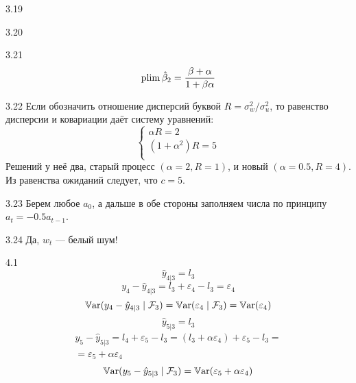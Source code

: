 \protect \hypertarget {soln:3.19}{}
\begin{solution}{{3.19}}
  
\end{solution}
\protect \hypertarget {soln:3.20}{}
\begin{solution}{{3.20}}
  
\end{solution}
\protect \hypertarget {soln:3.21}{}
\begin{solution}{{3.21}}
    \[
    \operatorname{plim} \hat \beta_2 = \frac{\beta + \alpha}{1 + \beta \alpha}
    \]
  
\end{solution}
\protect \hypertarget {soln:3.22}{}
\begin{solution}{{3.22}}
Если обозначить отношение дисперсий буквой $R = \sigma^2_w/\sigma^2_u$,
то равенство дисперсии и ковариации даёт систему уравнений:
\[
  \begin{cases}
    \alpha R = 2 \\
    (1+\alpha^2)R = 5 \\
  \end{cases}
\]
Решений у неё два, старый процесс $(\alpha=2, R=1)$, и новый $(\alpha=0.5, R=4)$.
Из равенства ожиданий следует, что $c=5$.
  
\end{solution}
\protect \hypertarget {soln:3.23}{}
\begin{solution}{{3.23}}
    Берем любое $a_0$, а дальше в обе стороны заполняем числа по принципу $a_t = -0.5 a_{t-1}$.
  
\end{solution}
\protect \hypertarget {soln:3.24}{}
\begin{solution}{{3.24}}
    Да, $w_t$ — белый шум!
  
\end{solution}
\protect \hypertarget {soln:4.1}{}
\begin{solution}{{4.1}}
  \[
    \hat y_{4|3} = l_3
  \]
  \[
    y_4 - \hat y_{4|3} = l_3 + \varepsilon_4 - l_3 = \varepsilon_4
  \]
  \[
  \operatorname{\mathbb{V}\mathrm{ar}}(y_4 - \hat y_{4|3} \mid \mathcal{F}_3) = \operatorname{\mathbb{V}\mathrm{ar}}(\varepsilon_4 \mid \mathcal{F}_3) = \operatorname{\mathbb{V}\mathrm{ar}}(\varepsilon_4)
  \]
  \[
  \hat y_{5|3} = l_3
  \]
  \begin{multline}
  y_5 - \hat y_{5|3} = l_4  + \varepsilon_5 - l_3  = (l_3 + \alpha \varepsilon_4)  +
   \varepsilon_5 - l_3 = \\
  = \varepsilon_5 + \alpha  \varepsilon_4
  \end{multline}
  \[
  \operatorname{\mathbb{V}\mathrm{ar}}(y_5 - \hat y_{5|3} \mid \mathcal{F}_3) = \operatorname{\mathbb{V}\mathrm{ar}}(\varepsilon_5 + \alpha  \varepsilon_4 )
  \]

\end{solution}
